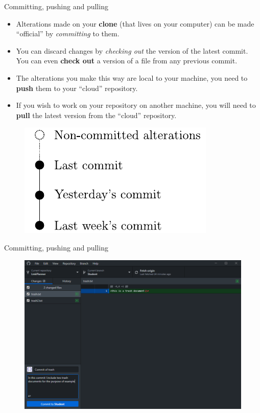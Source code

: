 \documentclass[usenames,dvipsnames,aspectratio=169]{beamer}
\newcommand{\aitem}{\item[$\cdot$]}
\begin{document}
\begin{frame}[t]{Committing, pushing and pulling}
\begin{minipage}{8cm}
\begin{itemize}
\aitem Alterations made on your \textbf{clone} (that lives on your computer) can be made ``official'' by \textit{committing} to them.
\aitem You can discard changes by \textit{checking out} the version of the latest commit. You can even \textbf{check out} a version of a file from any previous commit.
\aitem The alterations you make this way are local to your machine, you need to \textbf{push} them to your ``cloud'' repository.
\aitem If you wish to work on your repository on another machine, you will need to \textbf{pull} the latest version from the ``cloud'' repository.
\end{itemize}
\end{minipage}%
\hspace{.5cm}%
\begin{minipage}[*]{5.5cm}
\begin{figure}
\centering
\includegraphics[width=\linewidth]{commitTopology}
\end{figure}
\end{minipage}
\end{frame}


\begin{frame}[t]{Committing, pushing and pulling}
\begin{figure}
\centering
\includegraphics[width=.7\linewidth]{committing1}
\end{figure}
\end{frame}
\end{document}
